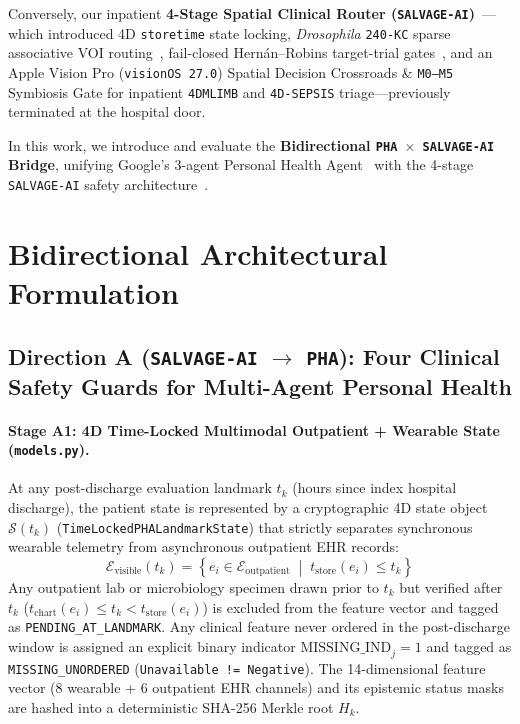 \documentclass[10pt,twocolumn,letterpaper]{article}
\begin{document}
Conversely, our inpatient \textbf{4-Stage Spatial Clinical Router (\texttt{SALVAGE-AI})}~\cite{satz2026spatial}---which introduced 4D \texttt{storetime} state locking, \textit{Drosophila} \texttt{240-KC} sparse associative VOI routing~\cite{dasgupta2017neural}, fail-closed Hern\'{a}n--Robins target-trial gates~\cite{hernan2016using,manski1990nonparametric}, and an Apple Vision Pro (\texttt{visionOS 27.0}) Spatial Decision Crossroads \& \texttt{M0--M5} Symbiosis Gate for inpatient \texttt{4DMLIMB} and \texttt{4D-SEPSIS} triage---previously terminated at the hospital door.

In this work, we introduce and evaluate the \textbf{Bidirectional \texttt{PHA $\times$ SALVAGE-AI} Bridge}, unifying Google's 3-agent Personal Health Agent~\cite{heydari2026anatomy} with the 4-stage \texttt{SALVAGE-AI} safety architecture~\cite{satz2026spatial}.

\section{Bidirectional Architectural Formulation}

\subsection{Direction A (\texttt{SALVAGE-AI} $\rightarrow$ \texttt{PHA}): Four Clinical Safety Guards for Multi-Agent Personal Health}

\paragraph{Stage A1: 4D Time-Locked Multimodal Outpatient + Wearable State (\texttt{models.py}).}
At any post-discharge evaluation landmark $t_k$ (hours since index hospital discharge), the patient state is represented by a cryptographic 4D state object $\mathcal{S}(t_k)$ (\texttt{TimeLockedPHALandmarkState}) that strictly separates synchronous wearable telemetry from asynchronous outpatient EHR records:
\begin{equation}
\mathcal{E}_{\text{visible}}(t_k) = \left\{ e_i \in \mathcal{E}_{\text{outpatient}} \;\middle|\; t_{\text{store}}(e_i) \le t_k \right\}
\end{equation}
Any outpatient lab or microbiology specimen drawn prior to $t_k$ but verified after $t_k$ ($t_{\text{chart}}(e_i) \le t_k < t_{\text{store}}(e_i)$) is excluded from the feature vector and tagged as \texttt{PENDING\_AT\_LANDMARK}. Any clinical feature never ordered in the post-discharge window is assigned an explicit binary indicator $\text{MISSING\_IND}_j = 1$ and tagged as \texttt{MISSING\_UNORDERED} (\texttt{Unavailable != Negative}). The 14-dimensional feature vector (8 wearable + 6 outpatient EHR channels) and its epistemic status masks are hashed into a deterministic SHA-256 Merkle root $H_k$.
\end{document}
